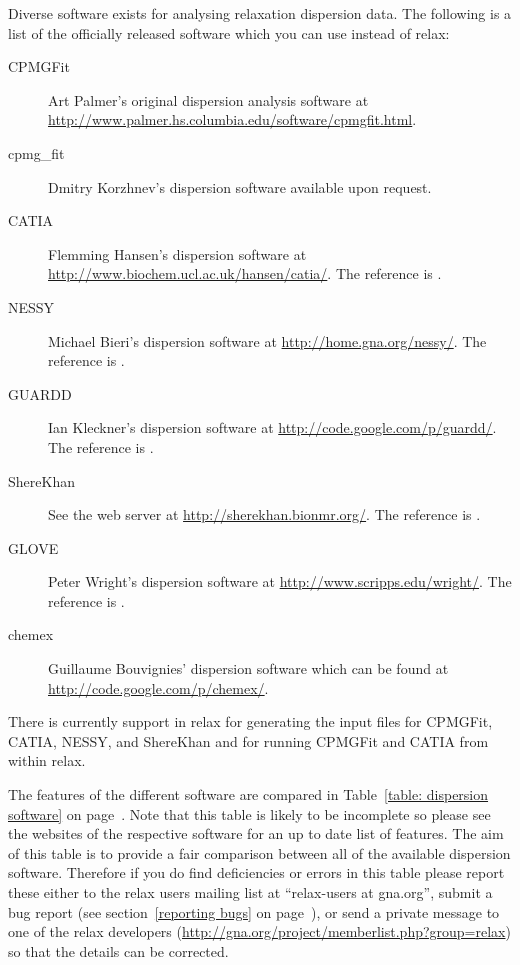 Diverse software exists for analysing relaxation dispersion data.
The following is a list of the officially released software which you can use instead of relax:
\begin{description}
  \item[CPMGFit] Art Palmer's original dispersion analysis software at \url{http://www.palmer.hs.columbia.edu/software/cpmgfit.html}.
  \item[cpmg\_fit] Dmitry Korzhnev's dispersion software available upon request.
  \item[CATIA] Flemming Hansen's dispersion software at \url{http://www.biochem.ucl.ac.uk/hansen/catia/}.
    The reference is \citet{Hansen08}.
  \item[NESSY] Michael Bieri's dispersion software at \url{http://home.gna.org/nessy/}.
    The reference is \citet{BieriGooley11}.
  \item[GUARDD] Ian Kleckner's dispersion software at \url{http://code.google.com/p/guardd/}.
    The reference is \citet{KlecknerFoster12}.
  \item[ShereKhan] See the web server at \url{http://sherekhan.bionmr.org/}.
    The reference is \citet{Mazur13}.
  \item[GLOVE] Peter Wright's dispersion software at \url{http://www.scripps.edu/wright/}.
    The reference is \citet{Sugase13}.
  \item[chemex] Guillaume Bouvignies' dispersion software which can be found at \url{http://code.google.com/p/chemex/}.
\end{description}

There is currently support in relax for generating the input files for CPMGFit, CATIA, NESSY, and ShereKhan and for running CPMGFit and CATIA from within relax.

The features of the different software are compared in Table~\ref{table: dispersion software} on page~\pageref{table: dispersion software}.
Note that this table is likely to be incomplete so please see the websites of the respective software for an up to date list of features.
The aim of this table is to provide a fair comparison between all of the available dispersion software.
Therefore if you do find deficiencies or errors in this table please report these either to the relax users mailing list at ``relax-users at gna.org'', submit a bug report (see section~\ref{reporting bugs} on page~\pageref{reporting bugs}), or send a private message to one of the relax developers (\url{http://gna.org/project/memberlist.php?group=relax}) so that the details can be corrected.

